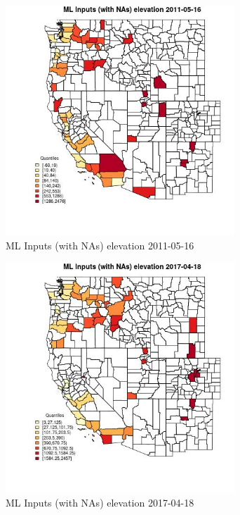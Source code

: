 \begin{figure} 
\centering  
\includegraphics[width=0.77\textwidth]{Code_Outputs/Report_ML_input_PM25_Step4_part_e_de_duplicated_aveswNAs_CountyelevationMean2011-05-16_2011-05-16.jpg} 
\caption{\label{fig:Report_ML_input_PM25_Step4_part_e_de_duplicated_aveswNAsCountyelevationMean2011-05-16_2011-05-16}ML Inputs (with NAs) elevation 2011-05-16} 
\end{figure} 
 

\begin{figure} 
\centering  
\includegraphics[width=0.77\textwidth]{Code_Outputs/Report_ML_input_PM25_Step4_part_e_de_duplicated_aveswNAs_CountyelevationMean2017-04-18_2017-04-18.jpg} 
\caption{\label{fig:Report_ML_input_PM25_Step4_part_e_de_duplicated_aveswNAsCountyelevationMean2017-04-18_2017-04-18}ML Inputs (with NAs) elevation 2017-04-18} 
\end{figure} 
 
